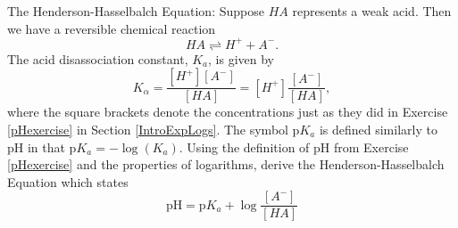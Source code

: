 {\label{HendersonHasselbalch}  The Henderson-Hasselbalch Equation:  Suppose $HA$ represents a weak acid. Then we have a reversible chemical reaction 
\[HA \rightleftharpoons H^{+} + A^{-}.\]  
The acid disassociation constant, $K_{a}$, is given by 
\[K_{\alpha} = \frac{[H^{+}][A^{-}]}{[HA]} = [H^{+}]\frac{[A^{-}]}{[HA]},\]
where the square brackets denote the concentrations just as they did in Exercise \ref{pHexercise} in Section \ref{IntroExpLogs}.  The symbol p$K_{a}$ is defined similarly to pH in that p$K_{a} = -\log(K_{a})$.  Using the definition of pH from Exercise \ref{pHexercise} and the properties of logarithms, derive the Henderson-Hasselbalch Equation which states 
\[\mbox{pH} = \mbox{p}K_{a} + \log\dfrac{[A^{-}]}{[HA]}\]}


